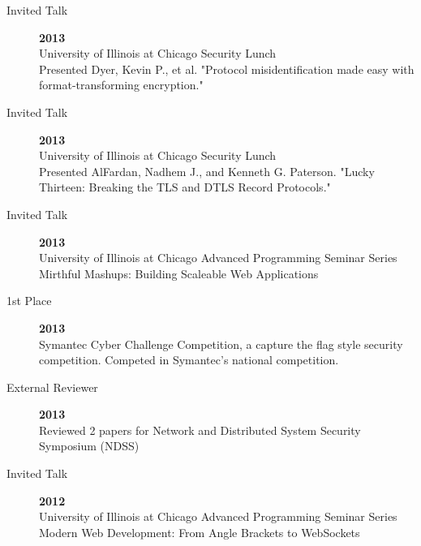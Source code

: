 \documentclass{vitae}
\begin{document}
\begin{description}
    \item[Invited Talk] \hfill \textbf{2013}\\
    University of Illinois at Chicago Security Lunch\\
    Presented Dyer, Kevin P., et al. "Protocol misidentification made easy with format-transforming encryption."

    \item[Invited Talk] \hfill \textbf{2013}\\
    University of Illinois at Chicago Security Lunch\\
    Presented AlFardan, Nadhem J., and Kenneth G. Paterson. "Lucky Thirteen: Breaking the TLS and DTLS Record Protocols."

    \item[Invited Talk] \hfill \textbf{2013}\\
    University of Illinois at Chicago Advanced Programming Seminar Series\\
    Mirthful Mashups: Building Scaleable Web Applications

    \item[1st Place] \hfill \textbf{2013}\\
    Symantec Cyber Challenge Competition, a capture the flag style security competition.  Competed in Symantec's national competition.

    \item[External Reviewer] \hfill \textbf{2013}\\
    Reviewed 2 papers for Network and Distributed System Security Symposium (NDSS)

    \item[Invited Talk] \hfill \textbf{2012}\\
    University of Illinois at Chicago Advanced Programming Seminar Series\\
    Modern Web Development: From Angle Brackets to WebSockets
  \end{description}
\end{document}
